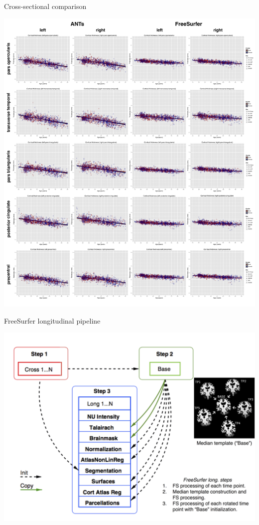 \documentclass[ignorenonframetext,]{beamer}
\begin{document}
\begin{frame}{Cross-sectional comparison}

\centering
\includegraphics[width=0.925 \textwidth]{../../Figures/rfImportanceRegions.pdf}

\end{frame}

\begin{frame}{FreeSurfer longitudinal pipeline}

\centering
\includegraphics[width=0.85 \textwidth]{../../Figures/FreeSurferLong.png}

\end{frame}
\end{document}
